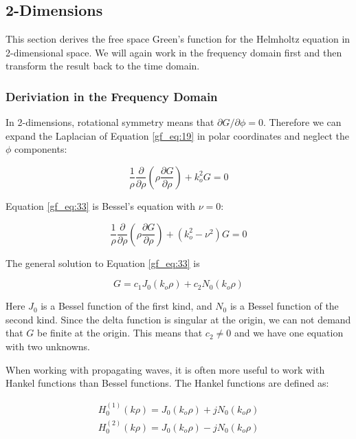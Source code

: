 \subsection {2-Dimensions}\label{gf_sec:2d}
This section derives the free space Green's function for the Helmholtz equation in 2-dimensional space. We will again work in the frequency domain first and then transform the result back to the time domain.

\subsubsection {Deriviation in the Frequency Domain}
In 2-dimensions,  rotational symmetry means that  $\partial G/\partial\phi =0$. Therefore we can expand the Laplacian of Equation \ref{gf_eq:19} in polar coordinates and neglect the $\phi$ components:

\begin{equation}
\frac{1}{\rho}\frac{\partial}{\partial \rho}\left(\rho\frac{\partial G}{\partial \rho}\right)+ k_o^2G = 0
\label{gf_eq:33}
\end{equation}
\renewcommand{\baselinestretch}{2} \small\normalsize

\noindent Equation \ref{gf_eq:33} is Bessel's equation with $\nu = 0$:

\begin{equation}
\frac{1}{\rho}\frac{\partial}{\partial \rho}\left(\rho\frac{\partial G}{\partial \rho}\right)+ \left(k_o^2 -\nu^2\right)G = 0
\label{gf_eq:34}
\end{equation}
\renewcommand{\baselinestretch}{2} \small\normalsize

\noindent The general solution to Equation \ref{gf_eq:33} is 

\begin{equation}
G = c_1J_0\left(k_o\rho\right) + c_2N_0\left(k_o\rho\right)
\label{gf_eq:35}
\end{equation}
\renewcommand{\baselinestretch}{2} \small\normalsize

Here $J_0$ is a Bessel function of the first kind, and $N_0$ is a Bessel function of the second kind. Since the delta function is singular at the origin, we can not demand that $G$ be finite at the origin. This means that $c_2 \neq 0$ and we have one equation with two unknowns.

When working with propagating waves, it is often more useful to work with Hankel functions than Bessel functions. The Hankel functions are defined as:

\begin{equation}
\begin{gathered}
H_0^{(1)}(k\rho) = J_0(k_o\rho) + jN_0(k_o\rho) \\
H_0^{(2)}(k\rho) = J_0(k_o\rho) - jN_0(k_o\rho)
\label{gf_eq:36}
\end{gathered}
\end{equation}
\renewcommand{\baselinestretch}{2} \small\normalsize


